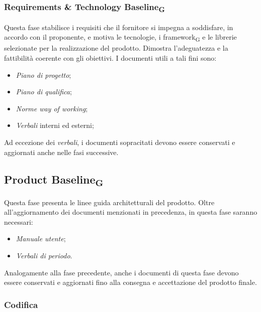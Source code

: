 \documentclass{article}
\begin{document}
\subsubsection*{Requirements \& Technology Baseline\textsubscript{G}}
Questa fase stabilisce i requisiti che il fornitore si impegna a soddisfare, in accordo con il proponente, e motiva le tecnologie, i framework\textsubscript{G} e le librerie selezionate per la realizzazione del prodotto. Dimostra l'adeguatezza e la fattibilità coerente con gli obiettivi. I documenti utili a tali fini sono:
\begin{itemize}
    \item \textit{Piano di progetto};
    \item \textit{Piano di qualifica};
    \item \textit{Norme way of working};
    \item \textit{Verbali} interni ed esterni;
\end{itemize}
Ad eccezione dei \textit{verbali}, i documenti sopracitati devono essere conservati e aggiornati anche nelle fasi successive.
\subsection*{Product Baseline\textsubscript{G}}
Questa fase presenta le linee guida architetturali del prodotto. Oltre all'aggiornamento dei documenti menzionati in precedenza, in questa fase saranno necessari:
\begin{itemize}
    \item \textit{Manuale utente};
    \item \textit{Verbali di periodo}.
\end{itemize}
Analogamente alla fase precedente, anche i documenti di questa fase devono essere conservati e aggiornati fino alla consegna e accettazione del prodotto finale.
\subsubsection{Codifica}
\end{document}
